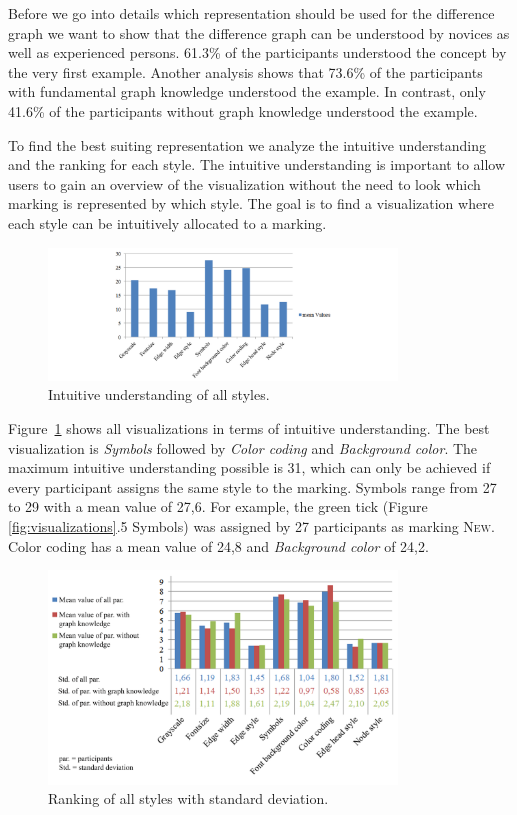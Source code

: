 \documentclass{llncs}
\begin{document}
Before we go into details which representation should be used for the difference graph we want to show that the difference graph can be understood by novices as well as experienced persons. 61.3\% of the participants understood the concept by the very first example. Another analysis shows that 73.6\% of the participants with fundamental graph knowledge understood the example. In contrast, only 41.6\% of the participants without graph knowledge understood the example.

To find the best suiting representation we analyze the intuitive understanding and the ranking for each style. The intuitive understanding is important to allow users to gain an overview of the visualization without the need to look which marking is represented by which style. The goal is to find a visualization where each style can be intuitively allocated to a marking.

\begin{figure}
	\centering
	\includegraphics[width=350px]{Images/IntuitiveUnderstanding.PNG}
	\caption{Intuitive understanding of all styles.}
	\label{fig:IntUnderstanding}
\end{figure}

Figure~\ref{fig:IntUnderstanding} shows all visualizations in terms of intuitive understanding. The best visualization is \emph{Symbols} followed by \emph{Color coding} and \emph{Background color}. The maximum intuitive understanding possible is 31, which can only be achieved if every participant assigns the same style to the marking. Symbols range from 27 to 29 with a mean value of 27,6. For example, the green tick (Figure \ref{fig:visualizations}.5 Symbols)  was assigned by 27 participants as marking \textsc{New}. Color coding has a mean value of 24,8 and \emph{Background color} of 24,2.


\begin{figure}
	\centering
	\includegraphics[width=350px]{Images/Ranking_Mean_StDeviation.PNG}
	\caption{Ranking of all styles with standard deviation.}
	\label{fig:SurveyResults}
\end{figure}
\end{document}
